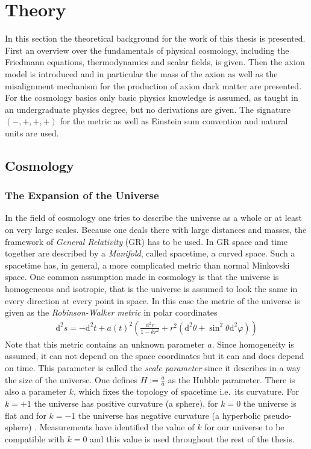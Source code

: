 \documentclass[twoside,a4paper, 12pt]{article}
\newcommand{\diff}{\mathrm{d}}
\numberwithin{equation}{section}
\begin{document}
\section{Theory}
\label{sec:theory}
In this section the theoretical background for the work of this thesis is presented.
First an overview over the fundamentals of physical cosmology, including the Friedmann equations,
thermodynamics and scalar fields, is given.
Then the axion model is introduced and in particular the mass of the axion as well as
the misalignment mechanism for the production of axion dark matter are presented.
For the cosmology basics only basic physics knowledge is assumed, as taught in an undergraduate
physics degree, but no derivations are given. The signature $(-, +, +, +)$ for the metric as well as Einstein sum
convention and natural units are used.

\subsection{Cosmology}

\subsubsection{The Expansion of the Universe}
\label{sec:cosmology}
In the field of cosmology one tries to describe the universe as a whole
or at least on very large scales. Because one deals there with large distances
and masses, the framework of \emph{General Relativity} (GR) has to be used.
In GR space and time together are described by a \emph{Manifold}, called spacetime, a curved space.
Such a spacetime has, in general, a more complicated metric than normal Minkovski space.
One common assumption made in cosmology is that the universe
is homogeneous and isotropic, that is the universe is assumed to look the same
in every direction at every point in space. In this case the metric of the universe
is given as the \emph{Robinson-Walker metric} \cite[Eq. 2.1]{TheEarlyUniverseKolbAndTurner} in polar coordinates
\begin{align}
    \label{eq:flrw}
    \diff^2 s = - \diff^2 t + a(t)^2 \left( \frac{\diff^2 r}{1 - k r^2} + r^2 (\diff^2 \theta + \sin^2 \theta \diff^2 \varphi) \right)
\end{align}
Note that this metric contains an unknown parameter $a$. Since homogeneity is assumed,
it can not depend on the space coordinates but it can and does depend on time.
This parameter is called the \emph{scale parameter} since it describes in a way the size
of the universe. One defines $H := \frac{\dot{a}}{a}$
as the Hubble parameter.
There is also a parameter $k$, which fixes the topology of spacetime i.e.\ its curvature.
For $k = +1$ the universe has positive curvature (a sphere), for $k = 0$ the universe is flat and for $k = -1$ the universe has negative curvature (a hyperbolic pseudo-sphere) \cite[Sec. 3.1]{TheEarlyUniverseKolbAndTurner}.
Measurements have identified the value of $k$ for our universe to be compatible with $k = 0$ and this value is used throughout the rest of the thesis.
\end{document}
